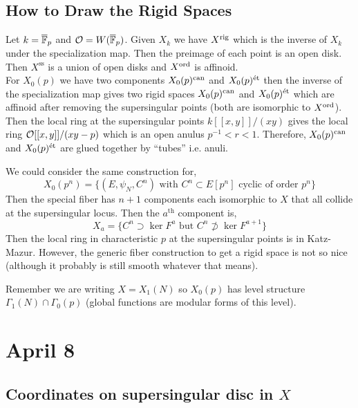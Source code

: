 \documentclass[12pt]{article}
\begin{document}
\renewcommand{\ss}{\mathrm{ss}}

\subsection{How to Draw the Rigid Spaces}

Let $k = \overline{\mathbb{F}}_p$ and $\mathcal{O} = W(\overline{\mathbb{F}}_p)$. Given $X_k$ we have $X^{\mathrm{rig}}$ which is the inverse of $X_k$ under the specialization map. Then the preimage of each point is an open disk. Then $X^{\ss}$ is a union of open disks and $X^{\operatorname{\mathrm{ord}}}$ is affinoid. 
\bigskip\\
For $X_0(p)$ we have two components $X_0(p)^{\mathrm{can}}$ and $X_0(p)^{\text{\'{e}t}}$ then the inverse of the specialization map gives two rigid spaces $X_0(p)^{\mathrm{can}}$ and $X_0(p)^{\text{\'{e}t}}$ which are affinoid after removing the supersingular points  (both are isomorphic to $X^{\operatorname{\mathrm{ord}}}$). Then the local ring at the supersingular points $k[[x,y]] /(xy)$ gives the local ring $\mathcal{O}[[x,y]]/(xy-p)$ which is an open anulus $p^{-1} < r < 1$. Therefore, $X_0(p)^{\mathrm{can}}$ and $X_0(p)^{\text{\'{e}t}}$ are glued together by ``tubes'' i.e. anuli.  

\begin{rmk}
We could consider the same construction for,
\[ X_0(p^n) = \{ (E, \psi_N, C^n) \text{ with } C^n \subset E[p^n] \text{ cyclic of order } p^n \} \]
Then the special fiber has $n+1$ components each isomorphic to $X$ that all collide at the supersingular locus. Then the $a^{\text{th}}$ component is,
\[ X_a = \{ C^n \supset \ker{F^a} \text{ but } C^n \not\supset \ker{F^{a+1}} \} \]
Then the local ring in characteristic $p$ at the supersingular points is in Katz-Mazur. However, the generic fiber construction to get a rigid space is not so nice (although it probably is still smooth whatever that means).  
\end{rmk}

\begin{rmk}
Remember we are writing $X = X_1(N)$ so $X_0(p)$ has level structure $\Gamma_1(N) \cap \Gamma_0(p)$ (global functions are modular forms of this level). 
\end{rmk}

\section{April 8}

\subsection{Coordinates on supersingular disc in $X$}
\end{document}
